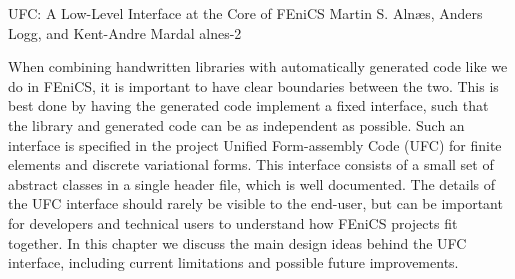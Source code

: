               {UFC: A Low-Level Interface at the Core of FEniCS}
              {Martin S. Aln\ae{}s, Anders Logg, and Kent-Andre Mardal}
              {alnes-2}

When combining handwritten libraries with automatically generated
code like we do in FEniCS, it is important to have clear boundaries
between the two.  This is best done by having the generated code
implement a fixed interface, such that the library and generated code
can be as independent as possible.  Such an interface is specified in
the project Unified Form-assembly Code (UFC) for finite elements and
discrete variational forms. This interface consists of a small set of
abstract classes in a single header file, which is well documented.
The details of the UFC interface should rarely be visible to the
end-user, but can be important for developers and technical users to
understand how FEniCS projects fit together. In this chapter we
discuss the main design ideas behind the UFC interface, including
current limitations and possible future improvements.
